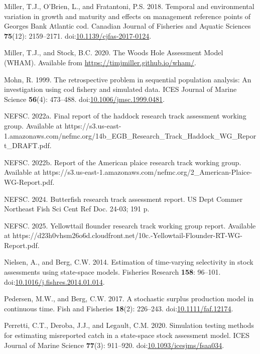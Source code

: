 \documentclass[
  12pt,
]{article}
\newlength{\cslhangindent}
\newenvironment{CSLReferences}[2] %
 {\begin{list}{}{%
  \setlength{\itemindent}{0pt} %
  \setlength{\leftmargin}{0pt} %
  \setlength{\parsep}{0pt} %
  \ifodd #1
   \setlength{\leftmargin}{\cslhangindent} %
   \setlength{\itemindent}{-1\cslhangindent} %
  \fi
  \setlength{\itemsep}{#2\baselineskip}}} %
 {\end{list}} %
\begin{document}
\begin{CSLReferences}{1}{0}
Miller, T.J., O'Brien, L., and Fratantoni, P.S. 2018. Temporal and
environmental variation in growth and maturity and effects on management
reference points of {G}eorges {B}ank {A}tlantic cod. Canadian Journal of
Fisheries and Aquatic Sciences \textbf{75}(12): 2159--2171.
doi:\href{https://doi.org/10.1139/cjfas-2017-0124}{10.1139/cjfas-2017-0124}.

Miller, T.J., and Stock, B.C. 2020. The {Woods Hole Assessment Model}
({WHAM}). Available from \url{https://timjmiller.github.io/wham/}.

Mohn, R. 1999. The retrospective problem in sequential population
analysis: An investigation using cod fishery and simulated data. ICES
Journal of Marine Science \textbf{56}(4): 473--488.
doi:\href{https://doi.org/10.1006/jmsc.1999.0481}{10.1006/jmsc.1999.0481}.

NEFSC. 2022a. Final report of the haddock research track assessment
working group. {Available} at
https://s3.us-east-1.amazonaws.com/nefmc.org/14b\_EGB\_Research\_Track\_Haddock\_WG\_Report\_DRAFT.pdf.

NEFSC. 2022b. Report of the {A}merican plaice research track working
group. {Available} at
https://s3.us-east-1.amazonaws.com/nefmc.org/2\_American-Plaice-WG-Report.pdf.

NEFSC. 2024. Butterfish research track assessment report. US Dept Commer
Northeast Fish Sci Cent Ref Doc. 24-03; 191 p.

NEFSC. 2025. Yellowttail flounder research track working group report.
{Available} at
https://d23h0vhsm26o6d.cloudfront.net/10c.-Yellowtail-Flounder-RT-WG-Report.pdf.

Nielsen, A., and Berg, C.W. 2014. Estimation of time-varying selectivity
in stock assessments using state-space models. Fisheries Research
\textbf{158}: 96--101.
doi:\href{https://doi.org/10.1016/j.fishres.2014.01.014}{10.1016/j.fishres.2014.01.014}.

Pedersen, M.W., and Berg, C.W. 2017. A stochastic surplus production
model in continuous time. Fish and Fisheries \textbf{18}(2): 226--243.
doi:\href{https://doi.org/10.1111/faf.12174}{10.1111/faf.12174}.

Perretti, C.T., Deroba, J.J., and Legault, C.M. 2020. Simulation testing
methods for estimating misreported catch in a state-space stock
assessment model. ICES Journal of Marine Science \textbf{77}(3):
911--920.
doi:\href{https://doi.org/10.1093/icesjms/fsaa034}{10.1093/icesjms/fsaa034}.


\end{CSLReferences}
\end{document}
